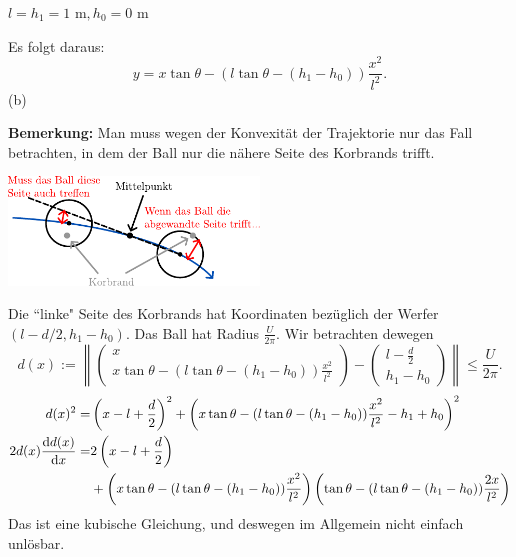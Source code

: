\begin{center}
	$l=h_1=1\text{ m},h_0=0\text{ m}$


\end{center}
Es folgt daraus:
\[
y=x\tan\theta-(l\tan\theta-(h_1-h_0))\frac{x^2}{l^2}
.\] 
(b)
\begin{tcolorbox}
	\textbf{Bemerkung:} Man muss wegen der Konvexität der Trajektorie nur das Fall betrachten, in dem der Ball nur die nähere Seite des Korbrands trifft.
	\begin{center}
		\includegraphics[width=0.5\textwidth]{blatt1diagram.pdf}
	\end{center}
\end{tcolorbox}
Die ``linke" Seite des Korbrands hat Koordinaten bezüglich der Werfer $(l-d / 2, h_1-h_0)$. Das Ball hat Radius $\frac{U}{2\pi}$. Wir betrachten dewegen
\[
d(x):=\left\|\begin{pmatrix} x \\ x\tan\theta-(l\tan\theta-(h_1-h_0))\frac{x^2}{l^2} \end{pmatrix} -\begin{pmatrix} l - \frac{d}{2}\\h_1-h_0 \end{pmatrix} \right\|\le \frac{U}{2\pi}
.\] 
\begin{align*}
	d(x)^2=&\left( x-l+\frac{d}{2} \right)^2+\left( x\tan\theta-(l\tan\theta-(h_1-h_0))\frac{x^2}{l^2}-h_1+h_0 \right)^2\\
	2d(x)\dv{d(x)}{x}=&2\left( x-l+\frac{d}{2} \right) \\
			  &+\left(x\tan\theta-(l\tan\theta-(h_1-h_0))\frac{x^2}{l^2}\right)\left( \tan\theta-(l\tan\theta-(h_1-h_0))\frac{2x}{l^2} \right) 
\end{align*}
Das ist eine kubische Gleichung, und deswegen im Allgemein nicht einfach unlösbar. 

